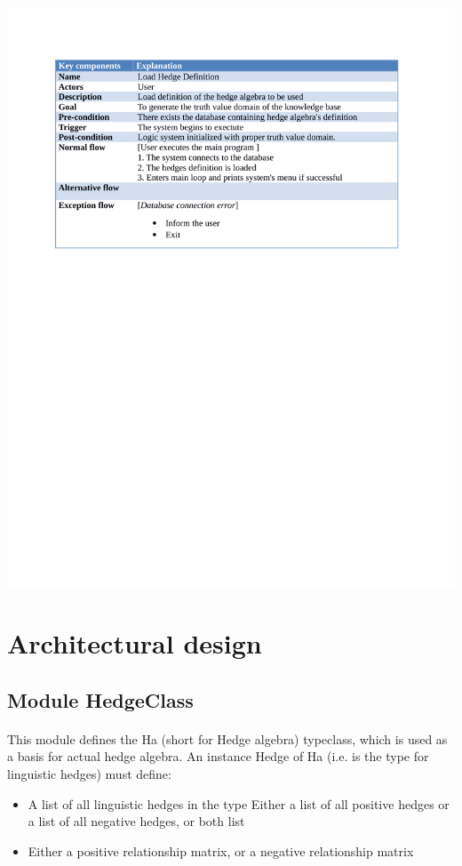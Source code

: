 \documentclass[26pt,fleqn,]{article}
\begin{document}
\includegraphics[clip=true, trim = 50 0 0 0, scale=0.8, page=12]{UCdesc}



\section{Architectural design}

\subsection{Module HedgeClass}

\paragraph{}This module defines the Ha (short for Hedge algebra) typeclass, which is used as a basis for  actual hedge algebra. An instance Hedge of Ha (i.e. is the type for linguistic hedges) must define:

\begin{itemize}
\item A list of all linguistic hedges in the type Either a list of all
  positive hedges or a list of all negative hedges, or both list
\item  Either a positive relationship matrix, or a negative relationship
  matrix
\end{itemize}
\end{document}
